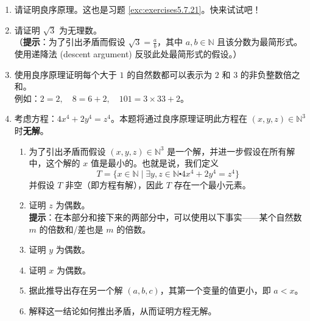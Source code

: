 \begin{enumerate}[label=(\arabic*)]
    \item 请证明良序原理。这也是习题 \ref{exc:exercises5.7.21}。快来试试吧！
    \item 请证明 $\sqrt{3}$ 为无理数。\\
        （\textbf{提示}：为了引出矛盾而假设 $\sqrt{3} = \frac{a}{b}$，其中 $a, b \in \mathbb{N}$ 且该分数为最简形式。使用递降法 (descent argument) 反驳此处最简形式的假设。）
    \item 使用良序原理证明每个大于 $1$ 的自然数都可以表示为 $2$ 和 $3$ 的非负整数倍之和。\\
        例如：$2 = 2, \quad 8 = 6 + 2, \quad 101 = 3 \times 33 + 2$。
    \item 考虑方程：$4x^4 + 2y^4 = z^4$。本题将通过良序原理证明此方程在 $(x, y, z) \in \mathbb{N}^3$ 时\textbf{无解}。
        \begin{enumerate}[label=(\alph*)]
            \item 为了引出矛盾而假设 $(x, y, z) \in \mathbb{N}^3$ 是一个解，并进一步假设在所有解中，这个解的 $x$ 值是最小的。也就是说，我们定义
            \[T = \{x \in \mathbb{N} \mid \exists y, z \in \mathbb{N} \centerdot 4x^4 + 2y^4 = z^4\}\]
            并假设 $T$ 非空（即方程有解），因此 $T$ 存在一个最小元素。
            \item 证明 $z$ 为偶数。\\
            \textbf{提示}：在本部分和接下来的两部分中，可以使用以下事实——某个自然数 $m$ 的倍数和/差也是 $m$ 的倍数。
            \item 证明 $y$ 为偶数。
            \item 证明 $x$ 为偶数。
            \item 据此推导出存在另一个解 $(a, b, c)$，其第一个变量的值更小，即 $a < x$。
            \item 解释这一结论如何推出矛盾，从而证明方程无解。
        \end{enumerate}
\end{enumerate}